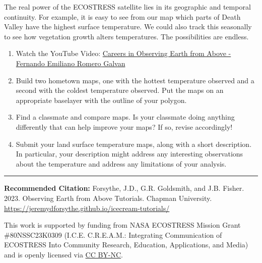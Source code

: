 \documentclass[oneside,a4paper,11pt,explicit]{book}
\begin{document}

The real power of the ECOSTRESS satellite lies in its geographic and temporal continuity. For example, it is easy to see from our map which parts of Death Valley have the highest surface temperature. We could also track this seasonally to see how vegetation growth alters temperatures. The possibilities are endless.

\vspace{1em}

\begin{tcolorbox}[colback=yellow!5!white,colframe=MACred,title= \vspace{.2em} \Large Make a Map Assignments]
    \large
    \begin{enumerate}
        \item Watch the YouTube Video: \href{https://www.youtube.com/watch?v=K24kSpOGssE}{Careers in Observing Earth from Above - Fernando Emiliano Romero Galvan}
        \item Build two hometown maps, one with the hottest temperature observed and a second with the coldest temperature observed. Put the maps on an appropriate baselayer with the outline of your polygon. 
        \item Find a classmate and compare maps. Is your classmate doing anything differently that can help improve your maps? If so, revise accordingly! 
        \item Submit your land surface temperature maps, along with a short description. In particular, your description might address any interesting observations about the temperature and address any limitations of your analysis.
    \end{enumerate}
\end{tcolorbox}

\vfill

\hrule

\vspace{1em}

\small \textbf{Recommended Citation:} Forsythe, J.D., G.R. Goldsmith, and J.B. Fisher. 2023. Observing Earth from Above Tutorials. Chapman University. \url{https://jeremydforsythe.github.io/icecream-tutorials/}

\vspace{1em}

This work is supported by funding from NASA ECOSTRESS Mission Grant \#80NSSC23K0309 (I.C.E. C.R.E.A.M.: Integrating Communication of ECOSTRESS Into Community Research, Education, Applications, and Media) and is openly licensed via \href{https://creativecommons.org/licenses/by-nc/4.0/}{CC BY-NC}.
\end{document}
